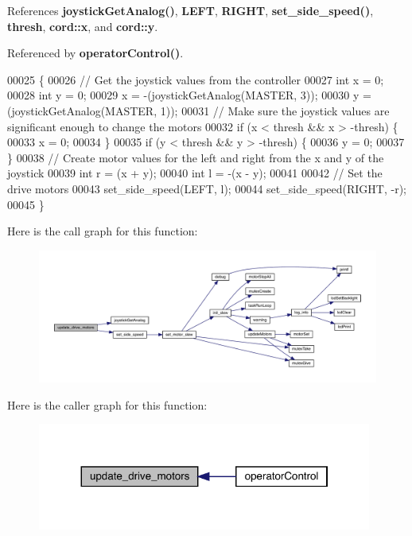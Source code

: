 References \textbf{ joystick\+Get\+Analog()}, \textbf{ L\+E\+FT}, \textbf{ R\+I\+G\+HT}, \textbf{ set\+\_\+side\+\_\+speed()}, \textbf{ thresh}, \textbf{ cord\+::x}, and \textbf{ cord\+::y}.



Referenced by \textbf{ operator\+Control()}.


\begin{DoxyCode}
00025                            \{
00026   \textcolor{comment}{// Get the joystick values from the controller}
00027   \textcolor{keywordtype}{int} x = 0;
00028   \textcolor{keywordtype}{int} y = 0;
00029   x = -(joystickGetAnalog(MASTER, 3));
00030   y = (joystickGetAnalog(MASTER, 1));
00031   \textcolor{comment}{// Make sure the joystick values are significant enough to change the motors}
00032   \textcolor{keywordflow}{if} (x < thresh && x > -thresh) \{
00033     x = 0;
00034   \}
00035   \textcolor{keywordflow}{if} (y < thresh && y > -thresh) \{
00036     y = 0;
00037   \}
00038   \textcolor{comment}{// Create motor values for the left and right from the x and y of the joystick}
00039   \textcolor{keywordtype}{int} r = (x + y);
00040   \textcolor{keywordtype}{int} l = -(x - y);
00041 
00042   \textcolor{comment}{// Set the drive motors}
00043   set_side_speed(LEFT, l);
00044   set_side_speed(RIGHT, -r);
00045 \}
\end{DoxyCode}
Here is the call graph for this function\+:
\nopagebreak
\begin{figure}[H]
\begin{center}
\leavevmode
\includegraphics[width=350pt]{drive_8h_a8224a4626a934d30ed587671b7004bf8_cgraph}
\end{center}
\end{figure}
Here is the caller graph for this function\+:
\nopagebreak
\begin{figure}[H]
\begin{center}
\leavevmode
\includegraphics[width=311pt]{drive_8h_a8224a4626a934d30ed587671b7004bf8_icgraph}
\end{center}
\end{figure}
